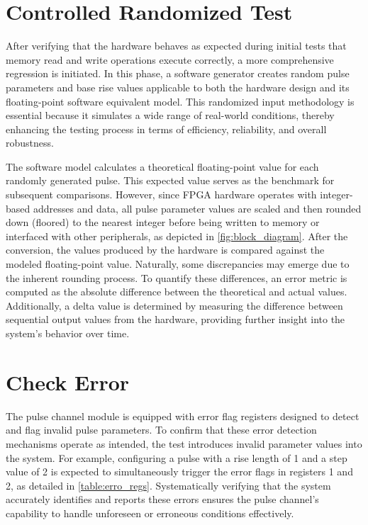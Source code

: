 \section{Controlled Randomized Test}

After verifying that the hardware behaves as expected during initial tests that memory read and write operations execute correctly, a more comprehensive regression is initiated. In this phase, a software generator creates random pulse parameters and base rise values applicable to both the hardware design and its floating-point software equivalent model. This randomized input methodology is essential because it simulates a wide range of real-world conditions, thereby enhancing the testing process in terms of efficiency, reliability, and overall robustness.

The software model calculates a theoretical floating-point value for each randomly generated pulse. This expected value serves as the benchmark for subsequent comparisons. However, since FPGA hardware operates with integer-based addresses and data, all pulse parameter values are scaled and then rounded down (floored) to the nearest integer before being written to memory or interfaced with other peripherals, as depicted in \autoref{fig:block_diagram}. After the conversion, the values produced by the hardware is compared against the modeled floating-point value. Naturally, some discrepancies may emerge due to the inherent rounding process. To quantify these differences, an error metric is computed as the absolute difference between the theoretical and actual values. Additionally, a delta value is determined by measuring the difference between sequential output values from the hardware, providing further insight into the system's behavior over time. 

\section{Check Error}

The pulse channel module is equipped with error flag registers designed to detect and flag invalid pulse parameters. To confirm that these error detection mechanisms operate as intended, the test introduces invalid parameter values into the system. For example, configuring a pulse with a rise length of 1 and a step value of 2 is expected to simultaneously trigger the error flags in registers 1 and 2, as detailed in \autoref{table:erro_regs}. Systematically verifying that the system accurately identifies and reports these errors ensures the pulse channel's capability to handle unforeseen or erroneous conditions effectively. 
